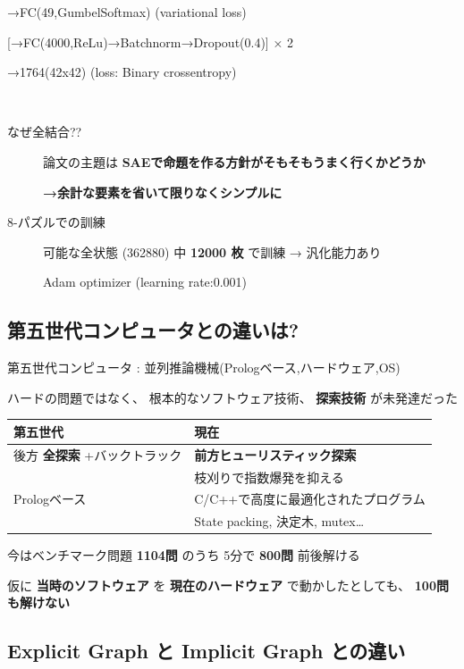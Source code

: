 →FC(49,GumbelSoftmax) (variational loss)

[→FC(4000,ReLu)→Batchnorm→Dropout(0.4)] × 2

→1764(42x42) (loss: Binary crossentropy)

　

\begin{description}
\item[{なぜ全結合??}] 論文の主題は \textbf{SAEで命題を作る方針がそもそもうまく行くかどうか}

\textbf{→余計な要素を省いて限りなくシンプルに}

\item[{8-パズルでの訓練}] 可能な全状態 (362880) 中 \textbf{12000 枚} で訓練 → 汎化能力あり

Adam optimizer (learning rate:0.001)
\end{description}

\subsection{第五世代コンピュータとの違いは?}
\label{sec:orgheadline59}

第五世代コンピュータ : 並列推論機械(Prologベース,ハードウェア,OS)

ハードの問題ではなく、 根本的なソフトウェア技術、 \textbf{探索技術} が未発達だった

\begin{center}
\begin{tabular}{ll}
第五世代 & 現在\\
\hline
後方 \textbf{全探索} +バックトラック & \textbf{前方ヒューリスティック探索}\\
 & 枝刈りで指数爆発を抑える\\
Prologベース & C/C++で高度に最適化されたプログラム\\
 & State packing, 決定木, mutex\ldots{}\\
\end{tabular}
\end{center}

今はベンチマーク問題 \textbf{1104問} のうち 5分で \textbf{800問} 前後解ける

仮に \textbf{当時のソフトウェア} を \textbf{現在のハードウェア} で動かしたとしても、 \textbf{100問も解けない}

\subsection{Explicit Graph と Implicit Graph との違い}
\label{sec:orgheadline60}


